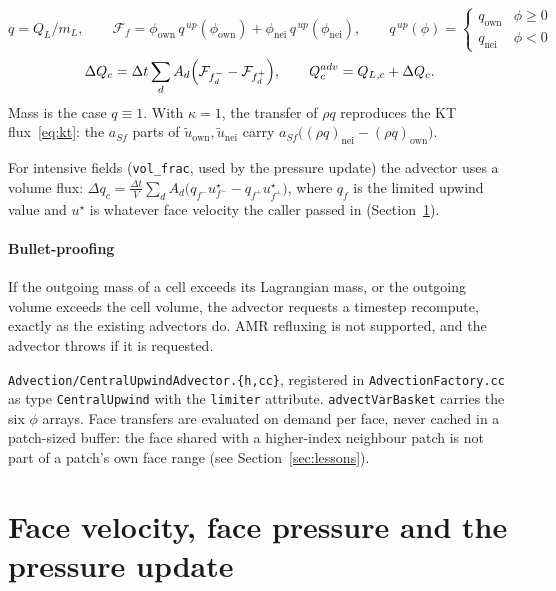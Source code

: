 \documentclass[11pt]{article}
\newcommand{\code}[1]{\texttt{\small #1}}
\newcommand{\file}[1]{\texttt{\small\color{Moss}#1}}
\newcommand{\own}{\mathrm{own}}
\newcommand{\nei}{\mathrm{nei}}
\newcommand{\dt}{\Delta t}
\begin{document}
\begin{equation}
  q = Q_L/m_L,\qquad
  \mathcal F_f = \phi_\own\, q^{\,up}(\phi_\own) + \phi_\nei\, q^{\,up}(\phi_\nei),\qquad
  q^{\,up}(\phi) = \begin{cases} q_\own & \phi\ge 0\\ q_\nei & \phi<0\end{cases}
\end{equation}
\begin{equation}
  \Delta Q_c = \dt\sum_{d} A_d\Bigl(\mathcal F_{f^-_d} - \mathcal F_{f^+_d}\Bigr),
  \qquad Q^{adv}_c = Q_{L,c} + \Delta Q_c .
\end{equation}
Mass is the case $q\equiv 1$. With $\kappa=1$, the transfer of $\rho q$ reproduces the
KT flux~\eqref{eq:kt}: the $a_{Sf}$ parts of $\tilde u_\own,\tilde u_\nei$ carry
$a_{Sf}\bigl((\rho q)_\nei-(\rho q)_\own\bigr)$.

For intensive fields (\code{vol\_frac}, used by the pressure update) the advector uses a
volume flux: $\Delta q_c = \frac{\dt}{V}\sum_d A_d\bigl(q_{f^-}u^\star_{f^-}-q_{f^+}u^\star_{f^+}\bigr)$,
where $q_f$ is the limited upwind value and $u^\star$ is whatever face velocity the caller
passed in (Section~\ref{sec:press}).

\paragraph{Bullet-proofing}
If the outgoing mass of a cell exceeds its Lagrangian mass, or the outgoing volume exceeds
the cell volume, the advector requests a timestep recompute, exactly as the existing
advectors do. AMR refluxing is not supported, and the advector throws if it is requested.

\begin{incode}
\file{Advection/CentralUpwindAdvector.\{h,cc\}}, registered in \file{AdvectionFactory.cc} as type
\code{CentralUpwind} with the \code{limiter} attribute. \code{advectVarBasket} carries the
six $\phi$ arrays. Face transfers are evaluated on demand per face, never cached in a
patch-sized buffer: the face shared with a higher-index neighbour patch is not part of a
patch's own face range (see Section~\ref{sec:lessons}).
\end{incode}

\section{Face velocity, face pressure and the pressure update}\label{sec:press}
\end{document}
